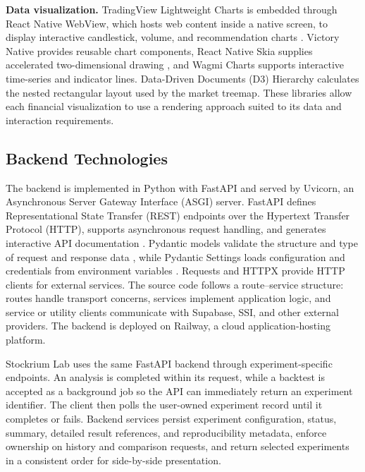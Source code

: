 \textbf{Data visualization.} TradingView Lightweight Charts is embedded through React Native WebView, which hosts web content inside a native screen, to display interactive candlestick, volume, and recommendation charts \cite{tradingviewLightweight2026}. Victory Native provides reusable chart components, React Native Skia supplies accelerated two-dimensional drawing \cite{reactNativeSkia2026}, and Wagmi Charts supports interactive time-series and indicator lines. Data-Driven Documents (D3) Hierarchy calculates the nested rectangular layout used by the market treemap. These libraries allow each financial visualization to use a rendering approach suited to its data and interaction requirements.

\subsection{Backend Technologies}

The backend is implemented in Python with FastAPI and served by Uvicorn, an Asynchronous Server Gateway Interface (ASGI) server. FastAPI defines Representational State Transfer (REST) endpoints over the Hypertext Transfer Protocol (HTTP), supports asynchronous request handling, and generates interactive API documentation \cite{fastapiFeatures2026}. Pydantic models validate the structure and type of request and response data \cite{pydanticModels2026}, while Pydantic Settings loads configuration and credentials from environment variables \cite{pydanticSettings2026}. Requests and HTTPX provide HTTP clients for external services. The source code follows a route--service structure: routes handle transport concerns, services implement application logic, and service or utility clients communicate with Supabase, SSI, and other external providers. The backend is deployed on Railway, a cloud application-hosting platform.

Stockrium Lab uses the same FastAPI backend through experiment-specific endpoints. An analysis is completed within its request, while a backtest is accepted as a background job so the API can immediately return an experiment identifier. The client then polls the user-owned experiment record until it completes or fails. Backend services persist experiment configuration, status, summary, detailed result references, and reproducibility metadata, enforce ownership on history and comparison requests, and return selected experiments in a consistent order for side-by-side presentation.

